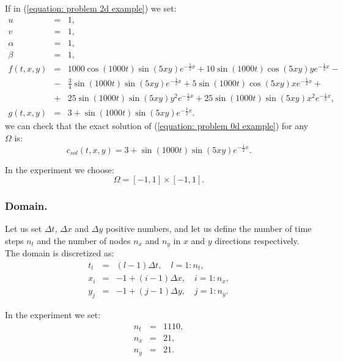 \documentclass[12pt]{article}
\begin{document}
If in (\ref{equation: problem 2d example}) we set:
\begin{eqnarray}
u & = & 1,
\\
v & = & 1,
\\
\alpha & = & 1,
\\
\beta & = & 1,
\\
f( t , x , y ) & = & 1000 \cos( 1000 t ) \sin( 5 x y ) e^{ - \frac{1}{2} x } + 10 \sin( 1000 t ) \cos( 5 x y ) y e^{ - \frac{1}{2} x } - \nonumber
\\
& - & \frac{3}{4} \sin( 1000 t ) \sin( 5 x y ) e^{ - \frac{1}{2} x } + 5 \sin( 1000 t ) \cos( 5 x y ) x e^{ - \frac{1}{2} x } + \nonumber 
\\
& + & 25 \sin( 1000 t ) \sin( 5 x y ) y^2 e^{ - \frac{1}{2} x } + 25 \sin( 1000 t ) \sin( 5 x y ) x^2 e^{ - \frac{1}{2} x },
\\
g( t , x , y ) & = & 3 + \sin( 1000  t ) \sin( 5 x y ) e^{ - \frac{1}{2} x }.
\end{eqnarray}
we can check that the exact solution of (\ref{equation: problem 0d example}) for any $\Omega$ is:
\begin{equation}
c_{sol}( t , x , y ) = 3 + \sin( 1000  t ) \sin( 5 x y ) e^{ - \frac{1}{2} x }.
\end{equation}

In the experiment we choose:
\begin{equation}
\Omega = [ -1 , 1 ] \times [ -1 , 1 ].
\end{equation}

\subsubsection{Domain.}
Let us set $\Delta t$, $\Delta x$ and $\Delta y$ positive numbers, and let us define the number of time steps $n_t$ and the number of nodes $n_x$ and $n_y$ in $x$ and $y$ directions respectively. The domain is discretized as:
\begin{eqnarray}
t_l & = & \left(l-1\right) \Delta t, \quad l = 1 : n_t,
\\
x_i & = & - 1 + \left(i-1\right) \Delta x, \quad i = 1 : n_x,
\\
y_j & = & - 1 + \left(j-1\right) \Delta y, \quad j = 1 : n_y.
\end{eqnarray}

In the experiment we set:
\begin{eqnarray}
n_t & = & 1110,
\\
n_x & = & 21,
\\
n_y & = & 21.
\end{eqnarray}
\end{document}
